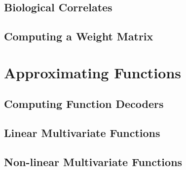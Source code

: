 \documentclass[10pt,letterpaper,oneside]{article}
\begin{document}
\subsection{Biological Correlates}

\subsection{Computing a Weight Matrix}

\section{Approximating Functions}

\subsection{Computing Function Decoders}

\subsection{Linear Multivariate Functions}

\subsection{Non-linear Multivariate Functions}

\printbibliography
\end{document}
